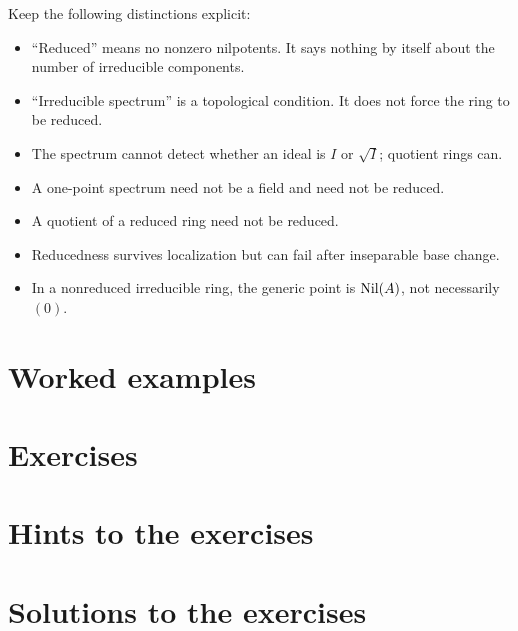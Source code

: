 Keep the following distinctions explicit:
\begin{itemize}
\item ``Reduced'' means no nonzero nilpotents.  It says nothing by itself about the number
      of irreducible components.
\item ``Irreducible spectrum'' is a topological condition.  It does not force the ring to
      be reduced.
\item The spectrum cannot detect whether an ideal is $I$ or $\sqrt I$; quotient rings can.
\item A one-point spectrum need not be a field and need not be reduced.
\item A quotient of a reduced ring need not be reduced.
\item Reducedness survives localization but can fail after inseparable base change.
\item In a nonreduced irreducible ring, the generic point is $\operatorname{Nil}(A)$, not necessarily
      $(0)$.
\end{itemize}

\section{Worked examples}


\section{Exercises}


\ifdefined\IncludeExerciseHints
\section*{Hints to the exercises}

\fi

\ifdefined\IncludeExerciseSolutions
\section*{Solutions to the exercises}

\fi

